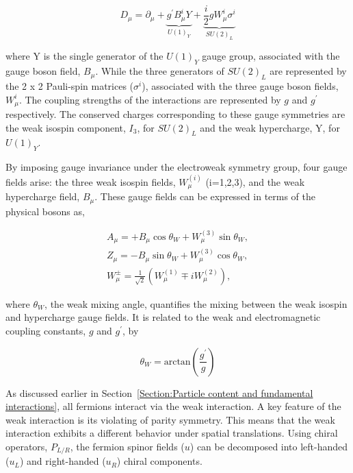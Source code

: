 \begin{equation}
    D_\mu = \partial_\mu + \underbrace{g^{\prime}B^i_\mu Y}_{U(1)_Y} + \underbrace{\frac{i}{2}gW^i_\mu\sigma^i}_{SU(2)_L}
\end{equation}

where Y is the single generator of the $U(1)_Y$ gauge group, associated with the gauge boson field, $B_\mu$. While the three generators of $SU(2)_L$ are represented by the 2 x 2 Pauli-spin matrices ($\sigma^i$), associated with the three gauge boson fields, $W^i_\mu$. The coupling strengths of the interactions are represented by $g$ and $g^{\prime}$ respectively. The conserved charges corresponding to these gauge symmetries are the weak isospin component, $I_3$, for $SU(2)_L$ and the weak hypercharge, Y, for $U(1)_Y$.

By imposing gauge invariance under the electroweak symmetry group, four gauge fields arise: the three weak isospin fields, $W_{\mu}^{(i)}$ (i=1,2,3), and the weak hypercharge field, $B_{\mu}$. These gauge fields can be expressed in terms of the physical bosons as,

\begin{equation}
\begin{array}{c}
A_{\mu} = + B_{\mu} \cos{\theta_{W}} + W_{\mu}^{(3)} \sin{\theta_{W}}, \\
Z_{\mu} = - B_{\mu} \sin{\theta_{W}} + W_{\mu}^{(3)} \cos{\theta_{W}}, \\
W_{\mu}^{\pm} = \frac{1}{\sqrt{2}} (W_{\mu}^{(1)} \mp iW_{\mu}^{(2)}),
\end{array}
\label{Equation:Introduction_PhysicalGaugeFields}
\end{equation}

where $\theta_{W}$, the weak mixing angle, quantifies the mixing between the weak isospin and hypercharge gauge fields. It is related to the weak and electromagnetic coupling constants, $g$ and $g^{\prime}$, by

\begin{equation}
    \theta_W = \text{arctan}(\frac{g^{\prime}}{g})
\end{equation}

As discussed earlier in Section~\ref{Section:Particle content and fundamental interactions}, all fermions interact via the weak interaction. A key feature of the weak interaction is its violating of parity symmetry. This means that the weak interaction exhibits a different behavior under spatial translations. Using chiral operators, $P_{L/R}$, the fermion spinor fields ($u$) can be decomposed into left-handed ($u_{L}$) and right-handed ($u_{R}$) chiral components. 

